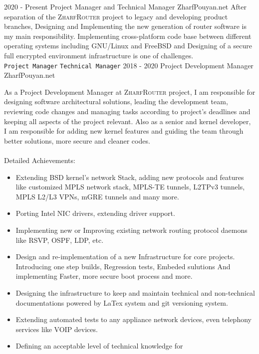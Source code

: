 \documentclass[12pt]{developercv}
\begin{document}
\begin{entrylist}
	\entry
		{2020 - Present}
		{Project Manager and Technical Manager}
		{ZharfPouyan.net}
		{
		After separation of the \textsc{ZharfRouter} project to legacy and
		developing product branches, Designing and Implementing the new 
		generation of router software is my main responsibility. Implementing
		cross-platform code base between different operating systems including
		GNU/Linux and FreeBSD and Designing of a secure full encrypted
		environment infrastructure is one of challenges.\\
		\texttt{Project Manager}\slashsep
		\texttt{Technical Manager}
		}
		\nopagebreak
	\entry
		{2018 - 2020}
		{Project Development Manager}
		{ZharfPouyan.net}
		{
		As a Project Development Manager at \textsc{ZharfRouter} project,
		I am responsible for designing software architectural solutions,
		leading the development team, reviewing code changes and managing
		tasks according to project's deadlines and keeping all aspects of
		the project relevant. Also as a senior and kernel developer,
		I am responsible for adding new kernel features and guiding the
		team through better solutions, more secure and cleaner codes.
		\\
		\\
		Detailed Achievements:
		\begin{itemize}
			\item Extending BSD kernel's network Stack, adding new protocols
			      and features like customized MPLS network stack,
			      MPLS-TE tunnels, L2TPv3 tunnels, MPLS L2/L3 VPNs,
			      mGRE tunnels and many more.
			\item Porting Intel NIC drivers, extending driver support.
			\item Implementing new or Improving existing network routing
			      protocol daemons like RSVP, OSPF, LDP, etc.
			\item Design and re-implementation of a new Infrastructure for
				  core projects. Introducing one step builds, Regression tests,
				  Embeded sulutions And implementing Faster, more secure boot
				  process and more.
			\item Designing the infrastructure to keep and maintain technical and
				  non-technical documentations powered by LaTex system and
				  git versioning system.
			\item Extending automated tests to any appliance network devices,
				  even telephony services like VOIP devices.
			\item Defining an acceptable level of technical knowledge for

\end{itemize}}
\end{entrylist}
\end{document}
